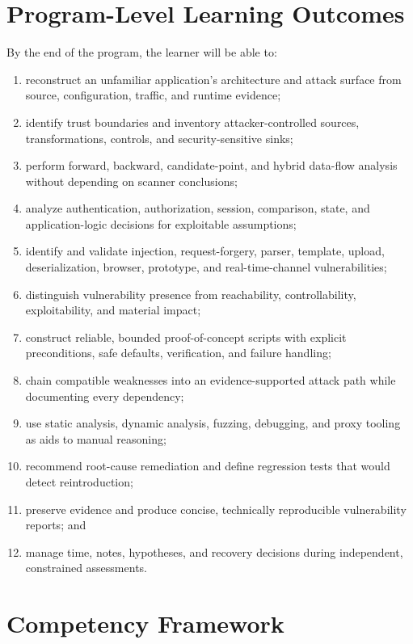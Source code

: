 \documentclass[11pt]{article}
\begin{document}
\section{Program-Level Learning Outcomes}

By the end of the program, the learner will be able to:
\begin{enumerate}
  \item reconstruct an unfamiliar application's architecture and attack surface from source, configuration, traffic, and runtime evidence;
  \item identify trust boundaries and inventory attacker-controlled sources, transformations, controls, and security-sensitive sinks;
  \item perform forward, backward, candidate-point, and hybrid data-flow analysis without depending on scanner conclusions;
  \item analyze authentication, authorization, session, comparison, state, and application-logic decisions for exploitable assumptions;
  \item identify and validate injection, request-forgery, parser, template, upload, deserialization, browser, prototype, and real-time-channel vulnerabilities;
  \item distinguish vulnerability presence from reachability, controllability, exploitability, and material impact;
  \item construct reliable, bounded proof-of-concept scripts with explicit preconditions, safe defaults, verification, and failure handling;
  \item chain compatible weaknesses into an evidence-supported attack path while documenting every dependency;
  \item use static analysis, dynamic analysis, fuzzing, debugging, and proxy tooling as aids to manual reasoning;
  \item recommend root-cause remediation and define regression tests that would detect reintroduction;
  \item preserve evidence and produce concise, technically reproducible vulnerability reports; and
  \item manage time, notes, hypotheses, and recovery decisions during independent, constrained assessments.
\end{enumerate}

\section{Competency Framework}
\end{document}
